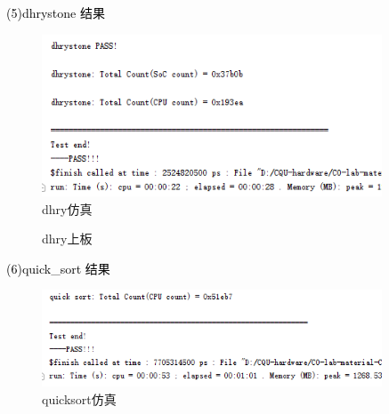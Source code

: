 \textcolor{black}{(5)dhrystone 结果}\\
\begin{figure}[htbp]
    \centering
    \includegraphics[width=0.9\textwidth]{image/dhtyS.png}
    \caption{dhry仿真}
\end{figure}

\begin{figure}[htbp]
    \centering
    \caption{dhry上板}
\end{figure}

\textcolor{black}{(6)quick\_sort 结果}\\
\begin{figure}[htbp]
    \centering
    \includegraphics[width=0.9\textwidth]{image/quicksortS.png}
    \caption{quicksort仿真}
\end{figure}


